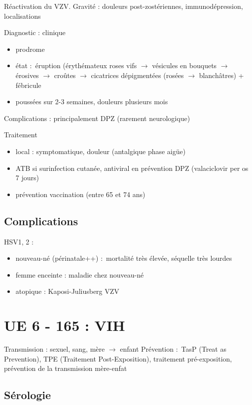 \documentclass{article}
\begin{document}
Réactivation du VZV. Gravité : douleurs post-zostériennes,
immunodépression, localisations

Diagnostic : clinique

\begin{itemize}
\item prodrome
\item état :~éruption (érythémateux roses vifs $\to$ vésicules en
  bouquets $\to$ érosives $\to$ croûtes
  $\to$ cicatrices dépigmentées (rosées $\to$
  blanchâtres) + fébricule
\item poussées sur 2-3 semaines, douleurs plusieurs mois
\end{itemize}

Complications : principalement DPZ (rarement neurologique)

Traitement

\begin{itemize}
\item local : symptomatique, douleur (antalgique phase aigüe)
\item ATB si surinfection cutanée, antiviral en prévention DPZ (valaciclovir
  per os 7 jours)
\item prévention vaccination (entre 65 et 74 ans)
\end{itemize}

\subsection{Complications}

HSV1, 2 :

\begin{itemize}
\item nouveau-né (périnatale++) :~mortalité très élevée, séquelle
très lourdes 
\item femme enceinte : maladie chez nouveau-né 
\item atopique : Kaposi-Juliusberg VZV
\end{itemize}

\section{UE 6 - 165 : VIH}

Transmission : sexuel, sang, mère $\to$ enfant Prévention
:~TasP (Treat as Prevention), TPE (Traitement Post-Exposition),
traitement pré-exposition, prévention de la transmission mère-enfat

\subsection{Sérologie}
\end{document}
